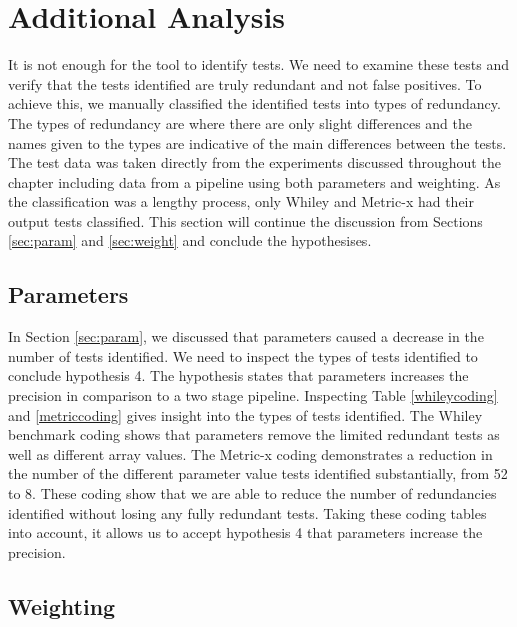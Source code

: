 \section{Additional Analysis}
\label{addAnaly}
It is not enough for the tool to identify tests. We need to examine these tests and verify that the tests identified are truly redundant and not false positives. To achieve this, we manually classified the identified tests into types of redundancy. The types of redundancy are where there are only slight differences and the names given to the types are indicative of the main differences between the tests. The test data was taken directly from the experiments discussed throughout the chapter including data from a pipeline using both parameters and weighting. As the classification was a lengthy process, only Whiley and Metric-x had their output tests classified. This section will continue the discussion from Sections \ref{sec:param} and \ref{sec:weight} and conclude the hypothesises.

\subsection{Parameters}

In Section \ref{sec:param}, we discussed that parameters caused a decrease in the number of tests identified. We need to inspect the types of tests identified to conclude hypothesis 4. The hypothesis states that parameters increases the precision in comparison to a two stage pipeline. Inspecting Table \ref{whileycoding} and \ref{metriccoding} gives insight into the types of tests identified. The Whiley benchmark coding shows that parameters remove the limited redundant tests as well as different array values. The Metric-x coding demonstrates a reduction in the number of the different parameter value tests identified substantially, from 52 to 8. These coding show that we are able to reduce the number of redundancies identified without losing any fully redundant tests. Taking these coding tables into account, it allows us to accept hypothesis 4 that parameters increase the precision.

\subsection{Weighting}

